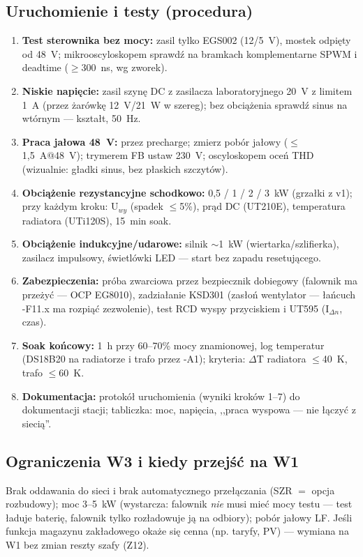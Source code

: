 \documentclass[11pt,a4paper]{article}
\begin{document}
\subsection{Uruchomienie i testy (procedura)}
\begin{enumerate}
\item \textbf{Test sterownika bez mocy:} zasil tylko EGS002 (12/5~V), mostek odpięty od 48~V;
mikrooscyloskopem sprawdź na bramkach komplementarne SPWM i deadtime ($\ge$300~ns, wg zworek).
\item \textbf{Niskie napięcie:} zasil szynę DC z zasilacza laboratoryjnego 20~V z limitem 1~A
(przez żarówkę 12~V/21~W w szereg); bez obciążenia sprawdź sinus na wtórnym --- kształt, 50~Hz.
\item \textbf{Praca jałowa 48~V:} przez precharge; zmierz pobór jałowy ($\le$1,5~A@48~V);
trymerem FB ustaw 230~V; oscyloskopem oceń THD (wizualnie: gładki sinus, bez płaskich szczytów).
\item \textbf{Obciążenie rezystancyjne schodkowo:} 0,5 / 1 / 2 / 3~kW (grzałki z v1); przy każdym
kroku: U$_{wy}$ (spadek $\le$5\%), prąd DC (UT210E), temperatura radiatora (UTi120S), 15~min soak.
\item \textbf{Obciążenie indukcyjne/udarowe:} silnik $\sim$1~kW (wiertarka/szlifierka), zasilacz
impulsowy, świetlówki LED --- start bez zapadu resetującego.
\item \textbf{Zabezpieczenia:} próba zwarciowa przez bezpiecznik dobiegowy (falownik ma przeżyć ---
OCP EG8010), zadziałanie KSD301 (zasłoń wentylator --- łańcuch -F11.x ma rozpiąć zezwolenie),
test RCD wyspy przyciskiem i UT595 (I$_{\Delta n}$, czas).
\item \textbf{Soak końcowy:} 1~h przy 60--70\% mocy znamionowej, log temperatur (DS18B20 na
radiatorze i trafo przez -A1); kryteria: $\Delta$T radiatora $\le$40~K, trafo $\le$60~K.
\item \textbf{Dokumentacja:} protokół uruchomienia (wyniki kroków 1--7) do dokumentacji stacji;
tabliczka: moc, napięcia, ,,praca wyspowa --- nie łączyć z siecią''.
\end{enumerate}

\subsection{Ograniczenia W3 i kiedy przejść na W1}
Brak oddawania do sieci i brak automatycznego przełączania (SZR $=$ opcja rozbudowy); moc 3--5~kW
(wystarcza: falownik \emph{nie} musi mieć mocy testu --- test ładuje baterię, falownik tylko
rozładowuje ją na odbiory); pobór jałowy LF. Jeśli funkcja magazynu zakładowego okaże się cenna
(np. taryfy, PV) --- wymiana na W1 bez zmian reszty szafy (Z12).
\end{document}
